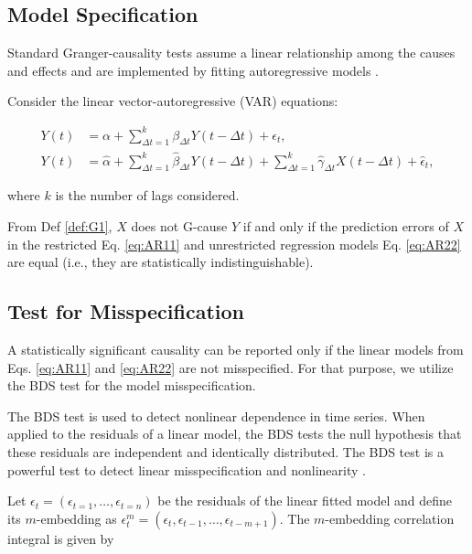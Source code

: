 \documentclass[]{book}
\theoremstyle{definition}
\theoremstyle{definition}
\theoremstyle{definition}
\theoremstyle{remark}
\begin{document}
\subsection{Model Specification}\label{model-specification}

Standard Granger-causality tests assume a linear relationship among the
causes and effects and are implemented by fitting autoregressive models
\citep{Wiener56, granger:econ}.

Consider the linear vector-autoregressive (VAR) equations:

\begin{align}
Y(t) &= {\alpha} + \sum^k_{\Delta t=1}{{\beta}_{\Delta t} Y(t-\Delta t)} + \epsilon_t, \label{eq:AR11}\\
Y(t) &= \widehat{\alpha} + \sum^k_{\Delta t=1}{{\widehat{\beta}}_{\Delta t} Y(t-\Delta t)} +  \sum^k_{\Delta t=1}{{\widehat{\gamma}}_{\Delta t}X(t-\Delta t)}+ \widehat{\epsilon}_t, \label{eq:AR22}
\end{align}

where \(k\) is the number of lags considered.

From Def \ref{def:G1}, \(X\) does not G-cause \(Y\) if and only if the
prediction errors of \(X\) in the restricted Eq. \eqref{eq:AR11} and
unrestricted regression models Eq. \eqref{eq:AR22} are equal (i.e., they
are statistically indistinguishable).

\subsection{Test for Misspecification}\label{test-for-misspecification}

A statistically significant causality can be reported only if the linear
models from Eqs. \eqref{eq:AR11} and \eqref{eq:AR22} are not misspecified.
For that purpose, we utilize the BDS test \citep{citeulike:9300127} for
the model misspecification.

The BDS test \citep{citeulike:9300127} is used to detect nonlinear
dependence in time series. When applied to the residuals of a linear
model, the BDS tests the null hypothesis that these residuals are
independent and identically distributed. The BDS test is a powerful test
to detect linear misspecification and nonlinearity
\citep{citeulike:9300127, Barnett97asingle-blind}.

Let \(\epsilon_t = (\epsilon_{t=1}, \ldots, \epsilon_{t=n})\) be the
residuals of the linear fitted model and define its \(m\)-embedding as
\(\epsilon_t^m = (\epsilon_{t}, \epsilon_{t-1}, \ldots, \epsilon_{t-m+1})\).
The \(m\)-embedding correlation integral is given by
\end{document}
